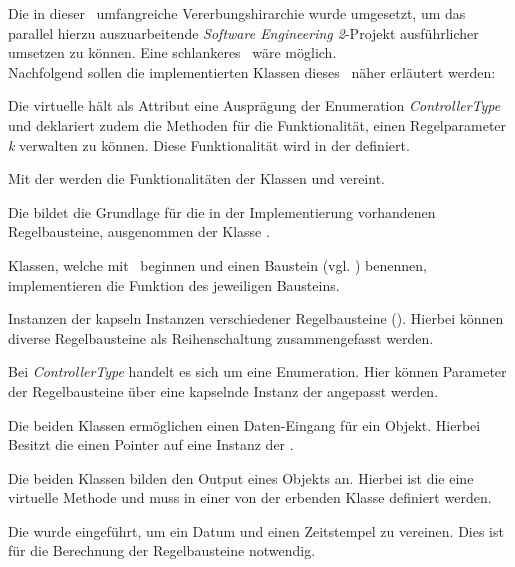 Die in dieser \Pack\ umfangreiche Vererbungshirarchie wurde umgesetzt, um das parallel hierzu auszuarbeitende \textit{Software Engineering 2}-Projekt ausführlicher umsetzen zu können. Eine schlankeres \Pack\ wäre möglich.\\
Nachfolgend sollen die implementierten Klassen dieses \Pack\ näher erläutert werden:


Die virtuelle  hält als Attribut eine Ausprägung der Enumeration \textit{ControllerType} und deklariert zudem die Methoden für die Funktionalität, einen Regelparameter \textit{k} verwalten zu können. Diese Funktionalität wird in der  definiert.


Mit der  werden die Funktionalitäten der Klassen  und  vereint.


Die  bildet die Grundlage für die in der Implementierung vorhandenen Regelbausteine, ausgenommen der Klasse .


Klassen, welche mit \glqq {}\grqq\ beginnen und einen Baustein (vgl. ) benennen, implementieren die Funktion des jeweiligen Bausteins.


Instanzen der  kapseln Instanzen verschiedener Regelbausteine (). Hierbei können diverse Regelbausteine als Reihenschaltung zusammengefasst werden.\\


Bei \textit{ControllerType} handelt es sich um eine Enumeration. Hier können Parameter der Regelbausteine über eine kapselnde Instanz der  angepasst werden.\\


Die beiden Klassen ermöglichen einen Daten-Eingang für ein Objekt. Hierbei Besitzt die  einen Pointer auf eine Instanz der .


Die beiden Klassen bilden den Output eines Objekts an. Hierbei ist die  eine virtuelle Methode und muss in einer von der  erbenden Klasse definiert werden.


Die  wurde eingeführt, um ein Datum und einen Zeitstempel zu vereinen. Dies ist für die Berechnung der Regelbausteine notwendig.